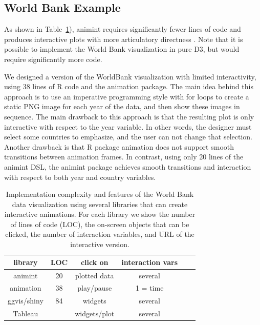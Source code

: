 \documentclass[journal]{vgtc}\usepackage[]{graphicx}\usepackage[]{color}
\begin{document}
\subsection{World Bank Example}


As shown in Table~\ref{tab:packages}),
animint requires significantly fewer lines of code and produces
interactive plots with more articulatory directness
\citep{Hutchins:1985}. Note that it is possible to implement the World
Bank visualization in pure D3, but would require significantly more code.


We designed a version of the WorldBank visualization with limited
interactivity, using 38 lines of R code and the animation
package. The main idea behind this approach is to use an imperative
programming style with for loops to create a static PNG image for each
year of the data, and then show these images in sequence. The main
drawback to this approach is that the resulting plot is only
interactive with respect to the year variable. In other words, the
designer must select some countries to emphasize, and the user can not
change that selection. Another drawback is that R package
animation does not support smooth transitions between
animation frames. In contrast, using only 20 lines of the animint DSL,
the animint package achieves smooth transitions and interaction with
respect to both year and country variables.

\begin{table}[t!]
  \caption{Implementation complexity and features
    of the World Bank data visualization
    using several libraries that can create interactive animations.
    For each library
    we show the number of lines of code (LOC), the on-screen objects
    that can be clicked,  the
    number of interaction variables, and URL of the interactive version.
  }
 \label{tab:packages}
 \begin{center}
  \begin{tabular}{cccccc}
    library & LOC & click on & interaction vars \\
    \hline
    animint     & 20 & plotted data & several \\
    animation   & 38 & play/pause & 1 = time \\
    ggvis/shiny & 84 & widgets & several \\
    Tableau    &    & widgets/plot & several \\
  \end{tabular}
 \end{center}
\end{table}
\end{document}
